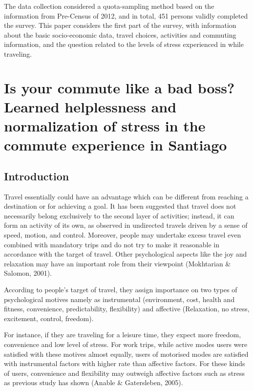 \documentclass[
11pt, %
oneside, %
english, %
singlespacing, %
]{macthesis} %
\begin{document}
The data collection considered a quota-sampling method based on the information from Pre-Census of 2012, and in total, 451 persons validly completed the survey. This paper considers the first part of the survey, with information about the basic socio-economic data, travel choices, activities and commuting information, and the question related to the levels of stress experienced in while traveling.

\hypertarget{is-your-commute-like-a-bad-boss-learned-helplessness-and-normalization-of-stress-in-the-commute-experience-in-santiago}{%
\chapter{Is your commute like a bad boss? Learned helplessness and normalization of stress in the commute experience in Santiago}\label{is-your-commute-like-a-bad-boss-learned-helplessness-and-normalization-of-stress-in-the-commute-experience-in-santiago}}

\hypertarget{introduction-3}{%
\section{Introduction}\label{introduction-3}}

Travel essentially could have an advantage which can be different from reaching a destination or for achieving a goal. It has been suggested that travel does not necessarily belong exclusively to the second layer of activities; instead, it can form an activity of its own, as observed in undirected travels driven by a sense of speed, motion, and control. Moreover, people may undertake excess travel even combined with mandatory trips and do not try to make it reasonable in accordance with the target of travel. Other psychological aspects like the joy and relaxation may have an important role from their viewpoint (Mokhtarian \& Salomon, 2001).

According to people's target of travel, they assign importance on two types of psychological motives namely as instrumental (environment, cost, health and fitness, convenience, predictability, flexibility) and affective (Relaxation, no stress, excitement, control, freedom).

For instance, if they are traveling for a leisure time, they expect more freedom, convenience and low level of stress. For work trips, while active modes users were satisfied with these motives almost equally, users of motorised modes are satisfied with instrumental factors with higher rate than affective factors. For these kinds of users, convenience and flexibility may outweigh affective factors such as stress as previous study has shown (Anable \& Gatersleben, 2005).
\end{document}
